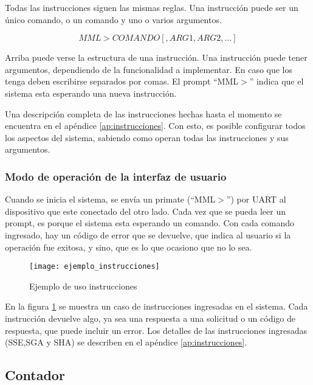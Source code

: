Todas las instrucciones siguen las mismas reglas. Una instrucción puede ser un único comando, o un comando y uno o varios argumentos.

\begin{equation}
	MML>COMANDO[,ARG1,ARG2,...]
\end{equation}

Arriba puede verse la estructura de una instrucción. Una instrucción puede tener argumentos, dependiendo de la funcionalidad a implementar. En caso que los tenga deben escribirse separados por comas. El prompt ``MML$>$'' indica que el sistema esta esperando una nueva instrucción.

Una descripción completa de las instrucciones hechas hasta el momento se encuentra en el apéndice \ref{ap:instrucciones}. Con esto, es posible configurar todos los aspectos del sistema, sabiendo como operan todas las instrucciones y sus argumentos.

\subsubsection{Modo de operación de la interfaz de usuario} %
\label{ssub:modo_de_operacion_de_la_interfaz_de_usuario}


Cuando se inicia el sistema, se envía un primate (``MML$>$'') por UART al dispositivo que este conectado del otro lado. Cada vez que se pueda leer un prompt, es porque el sistema esta esperando un comando. Con cada comando ingresado, hay un código de error que se devuelve, que indica al usuario si la operación fue exitosa, y sino, que es lo que ocasiono que no lo sea.

\begin{figure}[h]
  \centering
  \texttt{[image: ejemplo\_instrucciones]}
  \caption{Ejemplo de uso instrucciones}\label{fig:instrucciones}
\end{figure}

En la figura \ref{fig:instrucciones} se muestra un caso de instrucciones ingresadas en el sistema. Cada instrucción devuelve algo, ya sea una respuesta a una solicitud o un código de respuesta, que puede incluir un error. Los detalles de las instrucciones ingresadas (SSE,SGA y SHA) se describen en el apéndice \ref{ap:instrucciones}.


\subsection{Contador} %
\label{sub:contador}

